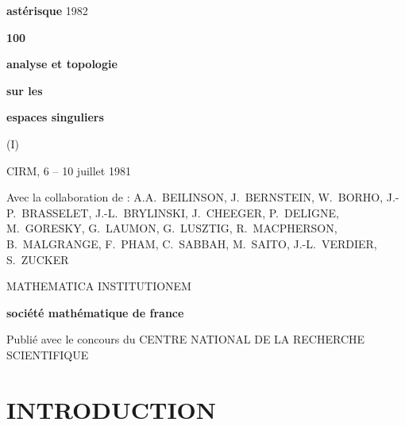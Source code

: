 \documentclass[12pt,a4paper]{article}
\theoremstyle{plain}
\theoremstyle{definition}
\theoremstyle{remark}
\begin{document}
\thispagestyle{empty}
\begin{center}
\vspace*{1cm}
{\Large\textbf{astérisque}} \hfill {\Large 1982}

\textbf{100}

\vspace{2cm}
{\LARGE\textbf{analyse et topologie}}

\vspace{0.5cm}
{\Large\textbf{sur les}}

\vspace{0.5cm}
{\LARGE\textbf{espaces singuliers}}

\vspace{0.5cm}
{\Large (I)}

\vspace{0.8cm}
{\normalsize CIRM, 6 -- 10 juillet 1981}

\vspace{1.5cm}
{\small Avec la collaboration de : A.A.~BEILINSON, J.~BERNSTEIN,
W.~BORHO, J.-P.~BRASSELET, J.-L.~BRYLINSKI, J.~CHEEGER,
P.~DELIGNE, M.~GORESKY, G.~LAUMON, G.~LUSZTIG,
R.~MACPHERSON, B.~MALGRANGE, F.~PHAM, C.~SABBAH,
M.~SAITO, J.-L.~VERDIER, S.~ZUCKER}

\vfill
{\small MATHEMATICA INSTITUTIONEM}

\vspace{0.5cm}
\textbf{société mathématique de france}

\vspace{0.3cm}
{\footnotesize Publié avec le concours du CENTRE NATIONAL DE LA RECHERCHE SCIENTIFIQUE}
\end{center}
\newpage

\thispagestyle{empty}
\section*{INTRODUCTION}
\end{document}
